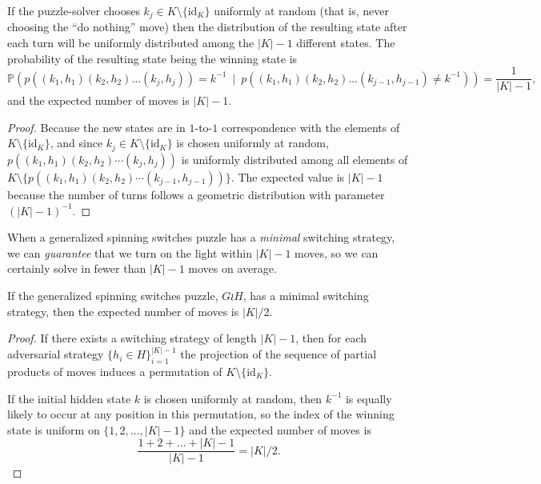 \begin{proposition}
  If the puzzle-solver chooses $k_j \in K \setminus \{\mathrm{id}_K\}$ uniformly
  at random (that is, never choosing the ``do nothing'' move)
  then the distribution of the resulting state after each turn will be uniformly
  distributed
  among the $|K| - 1$ different states. The probability of the resulting state
  being the winning state is
  \begin{equation}
    \mathbb{P}(p((k_1, h_1)(k_2, h_2)\dots(k_j, h_j))=k^{-1}\ \mid\ p((k_1, h_1)(k_2, h_2)\dots(k_{j-1}, h_{j-1})\neq k^{-1})) = \frac{1}{|K| - 1},
  \end{equation} and the expected number of moves is $|K| - 1$.
\label{prop:randomStrategy}
\end{proposition}
\begin{proof}
  Because the new states are in $1$-to-$1$ correspondence with the elements of
  $K \setminus \{\mathrm{id}_K\}$, and since
  $k_j \in K \setminus \{\mathrm{id}_K\}$
  is chosen uniformly at random, $p((k_1, h_1)(k_2, h_2)\cdots(k_j, h_j))$
  is uniformly distributed among all elements of
  ${K \setminus \{p((k_1, h_1)(k_2, h_2)\cdots(k_{j-1}, h_{j-1}))\}}$.
  The expected value is $|K| - 1$ because the number of turns follows a
  geometric distribution with parameter ${(|K| - 1)^{-1}}$.
\end{proof}

When a generalized spinning switches puzzle has a \textit{minimal} switching
strategy, we can \textit{guarantee} that we turn on the light within $|K|-1$
moves, so we can certainly solve in fewer than $|K|-1$ moves on average.

\begin{proposition}
If the generalized spinning switches puzzle, $G \wr H$, has a minimal switching
strategy, then the expected number of moves is $|K|/2$.
\end{proposition}
\begin{proof}
  If there exists a switching strategy of length $|K| - 1$,
  then for each adversarial strategy ${\{h_i \in H\}_{i=1}^{|K| - 1}}$
  the projection of the sequence of partial products of moves induces
  a permutation of $K \setminus \{\mathrm{id}_K\}$.

  If the initial hidden state $k$ is chosen uniformly at random, then
  $k^{-1}$ is equally likely to occur at any position in this permutation,
  so the index of the winning state is uniform on
  ${\{1, 2, \dots, |K| - 1\}}$ and the expected number of moves is
  \begin{equation}
    \frac{1 + 2 + \dots + |K| - 1}{|K| - 1} = |K|/2.
  \end{equation}
\end{proof}

